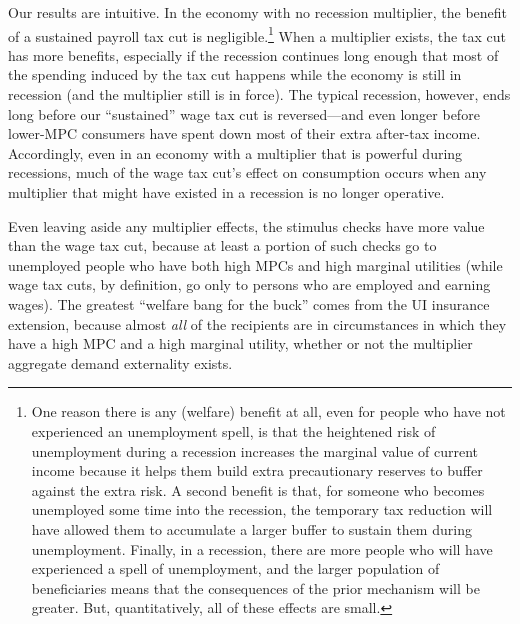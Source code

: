\documentclass[\econtexRoot/HAFiscal]{subfiles}
\begin{document}
Our results are intuitive.  In the economy with no recession multiplier, the benefit of a sustained payroll tax cut is negligible.\footnote{
One reason there is any (welfare) benefit at all, even for people who have not experienced an unemployment spell, is that the heightened risk of unemployment during a recession increases the marginal value of current income because it helps them build extra precautionary reserves to buffer against the extra risk.  A second benefit is that, for someone who becomes unemployed some time into the recession, the temporary tax reduction will have allowed them to accumulate a larger buffer to sustain them during unemployment.  Finally, in a recession, there are more people who will have experienced a spell of unemployment, and the larger population of beneficiaries means that the consequences of the prior mechanism will be greater.  But, quantitatively, all of these effects are small.}
When a multiplier exists, the tax cut has more benefits, especially if the recession continues long enough that most of the spending induced by the tax cut happens while the economy is still in recession (and the multiplier still is in force).  The typical recession, however, ends long before our ``sustained'' wage tax cut is reversed---and even longer before lower-MPC consumers have spent down most of their extra after-tax income. Accordingly, even in an economy with a multiplier that is powerful during recessions, much of the wage tax cut's effect on consumption occurs when any multiplier that might have existed in a recession is no longer operative.

Even leaving aside any multiplier effects, the stimulus checks have more value than the wage tax cut, because at least a portion of such checks go to unemployed people who have both high MPCs and high marginal utilities (while wage tax cuts, by definition, go only to persons who are employed and earning wages). The greatest ``welfare bang for the buck'' comes from the UI insurance extension, because almost \textit{all} of the recipients are in circumstances in which they have a high MPC and a high marginal utility, whether or not the multiplier aggregate demand externality exists.
\end{document}
